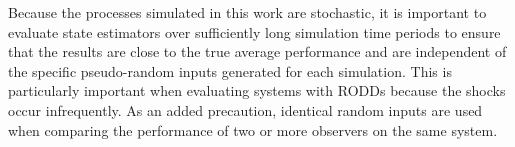 Because the processes simulated in this work are stochastic, it is important to evaluate state estimators over sufficiently long simulation time periods to ensure that the results are close to the true average performance and are independent of the specific pseudo-random inputs generated for each simulation. This is particularly important when evaluating systems with \gls{RODD}s because the shocks occur infrequently. As an added precaution, identical random inputs are used when comparing the performance of two or more observers on the same system.

